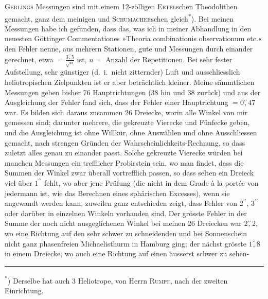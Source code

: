 \par\noindent\hspace*{\parindent}\textsc{Gerlings} Messungen sind mit einem 12-zölligen \textsc{Ertel}schen Theodolithen gemacht, ganz dem meinigen und \textsc{Schumacher}schen gleich\textsuperscript{*}).
Bei meinen Messungen habe ich gefunden, dass das, was ich in meiner Abhandlung in den neuesten Göttinger Commentationes »Theoria combinationis observationum etc.« den  Fehler nenne, aus mehrern Stationen, gute und  Messungen durch einander gerechnet, etwa \(=\frac{3\mathord{\overset{\prime\prime}{,}}5}{\surd n}\) ist, \(n=\) Anzahl der Repetitionen.
Bei sehr fester Aufstellung, sehr günstiger (d.~i.\ nicht zitternder) Luft und ausschliesslich heliotropischen Zielpunkten ist er aber beträchtlich kleiner.
Meine sämmtlichen Messungen geben bisher 76 Hauptrichtungen (38 hin und 38 zurück) und aus der Ausgleichung der Fehler fand sich, dass der  Fehler einer Hauptrichtung \(=0\mathord{\overset{\prime\prime}{,}}47\) war.
Es bilden sich daraus zusammen 26 Dreiecke, worin alle Winkel von mir gemessen sind; darunter mehrere, die gekreuzte Vierecke und Fünfecke geben, und die Ausgleichung ist ohne Willkür, ohne Auswählen und ohne Ausschliessen gemacht, nach strengen Gründen der Wahrscheinlichkeits-Rechnung, so dass zuletzt alles genau zu einander passt.
Solche gekreuzte Vierecke würden bei manchen Messungen ein trefflicher Probirstein sein, wo man findet, dass die Summen der Winkel zwar überall vortrefflich passen, so dass selten ein Dreieck viel über \(1^{\prime\prime}\) fehlt, wo aber jene Prüfung (die nicht in dem Grade à la portée von jedermann ist, wie das Berechnen eines sphärischen Excesses), wenn sie angewandt werden kann, zuweilen ganz entschieden zeigt, dass Fehler von \(2^{\prime\prime}\), \(3^{\prime\prime}\) oder darüber in einzelnen Winkeln vorhanden sind.
Der grösste Fehler in der Summe der noch nicht ausgeglichenen Winkel bei meinen 26 Dreiecken war \(2\mathord{\overset{\prime\prime}{,}}2\), wo eine Richtung auf den sehr schwer zu schneidenden und bei Sonnenschein nicht ganz phasenfreien Michaelisthurm in Hamburg ging; der nächst grösste \(1\mathord{\overset{\prime\prime}{,}}8\) in einem Dreiecke, wo auch eine Richtung auf einen äusserst schwer zu sehen-
\par\smallskip\noindent\rule{.24\textwidth}{.4pt}\par\smallskip
{\footnotesize\noindent\hspace*{1.5em}\textsuperscript{*}) Derselbe hat auch 3 Heliotrope, von Herrn \textsc{Rumpf}, nach der zweiten Einrichtung.\par}
